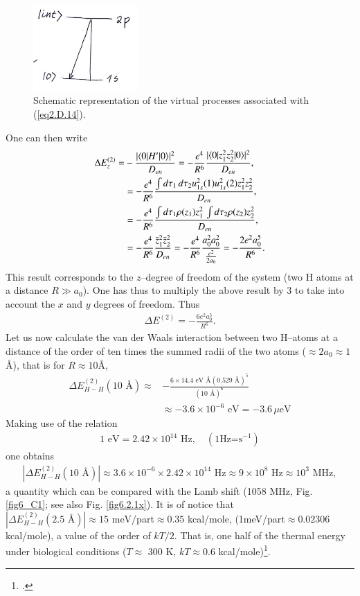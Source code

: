 \begin{subappendices}
        \begin{figure}[h!]
         \centerline{\includegraphics*[width=4cm,angle=0]{nutshell/figs/fig2D5.pdf}}
         \caption{Schematic representation of the virtual processes associated with (\ref{eq2.D.14}).}\label{fig2.D.5}
         \end{figure}
  One can then write
  \begin{align}\label{eq2.D.17}
  \nonumber \Delta E_z^{(2)}=&-\frac{|\langle {0|H'|0} \rangle|^2}{D_{en}}=-\frac{e^4}{R^6}\frac{|\langle {0|z_1^2z_2^2|0} \rangle|^2}{D_{en}},\\
\nonumber  &=-\frac{e^4}{R^6}\frac{\int d\tau_1\,d\tau_2u^2_{1s}(1)u^2_{1s}(2)z_1^2z_2^2}{D_{en}},\\
\nonumber  &=-\frac{e^4}{R^6}\frac{\int d\tau_1\rho(z_1)z_1^2\,\int d\tau_2\rho(z_2)z_2^2}{D_{en}},\\
&=-\frac{e^4}{R^6}\frac{\bar z_1^2 \bar z_2^2}{D_{en}}=-\frac{e^4}{R^6}\frac{a_0^2a_0^2}{\frac{e^2}{2a_0}}=-\frac{2e^2a_0^5}{R^6}.  
   \end{align} 
This result corresponds to the $z$--degree of freedom of the system (two H atoms at a distance $R\gg a_0$). One has thus to multiply the above result by 3 to take into account the $x$ and $y$ degrees of freedom. Thus   
   \begin{align}\label{eq2.D.18}
\Delta E^{(2)}=-\frac{6e^2a_0^5}{R^6}.
 \end{align}
Let us now calculate the van der Waals interaction between two H--atoms at a distance of the order of ten times the summed radii of the two atoms ($\approx2a_0\approx1$\AA), that is for $R\approx10$\AA, 
  \begin{align}\label{eq2.D.19}
  \nonumber \Delta E_{H-H}^{(2)}(10\text{ \AA})\approx&-\frac{6\times14.4\text{ eV \AA}(0.529\text{ \AA})^5}{(10\text{ \AA})^6}\\
  &\approx-3.6\times10^{-6}\text{ eV}=-3.6\,\mu\text{eV}  
   \end{align}  
Making use of the relation
\begin{align}\label{eq2.D.20}
1\text{ eV}=2.42\times 10^{14}\text{ Hz},\quad(1\text{Hz=s}^{-1})  
   \end{align}  
 one obtains
\begin{align}\label{eq2.D.21}
|\Delta E_{H-H}^{(2)}(10\text{ \AA})|\approx3.6\times 10^{-6}\times 2.42\times 10^{14}\text{ Hz}\approx9\times10^8\text{ Hz}\approx10^3\text{ MHz},      
\end{align} 
 a quantity which can be compared with the Lamb shift (1058 MHz, Fig. \ref{fig6_C1}; see also Fig. \ref{fig6.2.1x}). It is of notice that $|\Delta E_{H-H}^{(2)}(2.5\text{ \AA})|\approx15\text{ meV}/$part$\approx0.35$ kcal/mole, (1meV/part$\approx0.02306$ kcal/mole), a value of the order of $kT/2$. That is, one half of the thermal energy under biological conditions ($T\approx$ 300 K, $kT\approx 0.6$ kcal/mole)\footnote{\cite{Huang:05}.}.

\end{subappendices}
